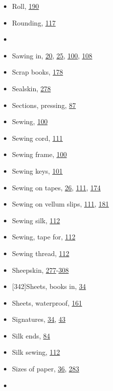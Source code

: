 \documentclass[
]{article}
\begin{document}
\begin{itemize}
\item
  Roll, \protect\hyperlink{Page_190}{190}
\item
  Rounding, \protect\hyperlink{Page_117}{117}
\item
  ~
\item
  {Sawing} in, \protect\hyperlink{Page_20}{20},
  \protect\hyperlink{Page_25}{25}, \protect\hyperlink{Page_100}{100},
  \protect\hyperlink{Page_108}{108}
\item
  Scrap books, \protect\hyperlink{Page_178}{178}
\item
  Sealskin, \protect\hyperlink{Page_278}{278}
\item
  Sections, pressing, \protect\hyperlink{Page_87}{87}
\item
  Sewing, \protect\hyperlink{Page_100}{100}
\item
  Sewing cord, \protect\hyperlink{Page_111}{111}
\item
  \protect\hypertarget{Sewing_frame}{}{}Sewing frame,
  \protect\hyperlink{Page_100}{100}
\item
  Sewing keys, \protect\hyperlink{Page_101}{101}
\item
  Sewing on tapes, \protect\hyperlink{Page_26}{26},
  \protect\hyperlink{Page_111}{111}, \protect\hyperlink{Page_174}{174}
\item
  Sewing on vellum slips, \protect\hyperlink{Page_111}{111},
  \protect\hyperlink{Page_181}{181}
\item
  Sewing silk, \protect\hyperlink{Page_112}{112}
\item
  Sewing, tape for, \protect\hyperlink{Page_112}{112}
\item
  Sewing thread, \protect\hyperlink{Page_112}{112}
\item
  Sheepskin,
  \protect\hyperlink{Page_277}{277}-\protect\hyperlink{Page_308}{308}
\item
  {\protect\hypertarget{Page_342}{}{{[}342{]}}}Sheets, books in,
  \protect\hyperlink{Page_34}{34}
\item
  Sheets, waterproof, \protect\hyperlink{Page_161}{161}
\item
  Signatures, \protect\hyperlink{Page_34}{34},
  \protect\hyperlink{Page_43}{43}
\item
  Silk ends, \protect\hyperlink{Page_84}{84}
\item
  Silk sewing, \protect\hyperlink{Page_112}{112}
\item
  Sizes of paper, \protect\hyperlink{Page_36}{36},
  \protect\hyperlink{Page_283}{283}
\item

\end{itemize}
\end{document}
